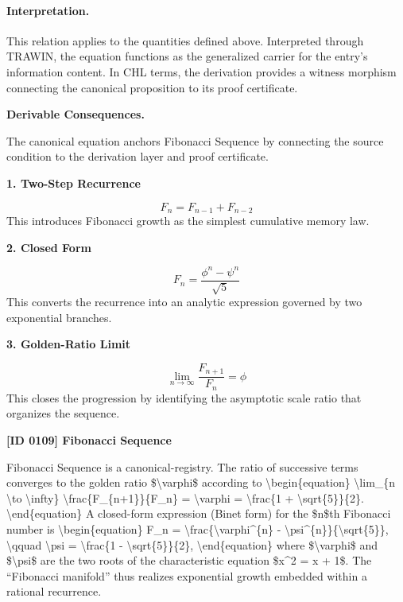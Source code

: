 \paragraph{Interpretation.}
This relation applies to the quantities defined above. Interpreted through TRAWIN, the equation functions as the generalized carrier for the entry’s information content. In CHL terms, the derivation provides a witness morphism connecting the canonical proposition to its proof certificate.

\par\vspace{0.35em}
\noindent\textbf{Derivable Consequences.}\quad
\begingroup
\footnotesize
\raggedright
The canonical equation anchors Fibonacci Sequence by connecting the source condition to the derivation layer and proof certificate.
\par\endgroup

\noindent\textbf{1. Two-Step Recurrence}\par
\[
F_n = F_{n-1}+F_{n-2}
\]
\noindent This introduces Fibonacci growth as the simplest cumulative memory law.\par
\noindent\textbf{2. Closed Form}\par
\[
F_n = \frac{\phi^n-\psi^n}{\sqrt{5}}
\]
\noindent This converts the recurrence into an analytic expression governed by two exponential branches.\par
\noindent\textbf{3. Golden-Ratio Limit}\par
\[
\lim_{n\to\infty} \frac{F_{n+1}}{F_n} = \phi
\]
\noindent This closes the progression by identifying the asymptotic scale ratio that organizes the sequence.\par

\clearpage
\noindent\textbf{[ID 0109] Fibonacci Sequence}\par
\vspace{0.35em}
\begingroup\small
{}
Fibonacci Sequence is a canonical-registry. The ratio of successive terms converges to the golden ratio \$\textbackslash{}varphi\$ according to \textbackslash{}begin\{equation\} \textbackslash{}lim\_\{n \textbackslash{}to \textbackslash{}infty\} \textbackslash{}frac\{F\_\{n+1\}\}\{F\_n\} = \textbackslash{}varphi = \textbackslash{}frac\{1 + \textbackslash{}sqrt\{5\}\}\{2\}. \textbackslash{}end\{equation\} A closed-form expression (Binet form) for the \$n\$th Fibonacci number is \textbackslash{}begin\{equation\} F\_n = \textbackslash{}frac\{\textbackslash{}varphi\textasciicircum{}\{n\} - \textbackslash{}psi\textasciicircum{}\{n\}\}\{\textbackslash{}sqrt\{5\}\}, \textbackslash{}qquad \textbackslash{}psi = \textbackslash{}frac\{1 - \textbackslash{}sqrt\{5\}\}\{2\}, \textbackslash{}end\{equation\} where \$\textbackslash{}varphi\$ and \$\textbackslash{}psi\$ are the two roots of the characteristic equation \$x\textasciicircum{}2 = x + 1\$. The ``Fibonacci manifold'' thus realizes exponential growth embedded within a rational recurrence.

